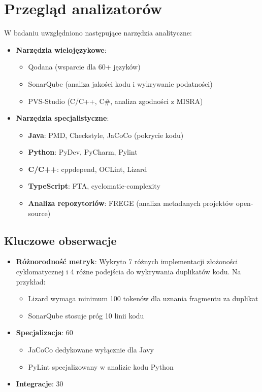\documentclass[a4paper,12pt]{article}
\begin{document}
\section{Przegląd analizatorów}
W badaniu uwzględniono następujące narzędzia analityczne:

\begin{itemize}
\item \textbf{Narzędzia wielojęzykowe}:
\begin{itemize}
\item Qodana (wsparcie dla 60+ języków)
\item SonarQube (analiza jakości kodu i wykrywanie podatności)
\item PVS-Studio (C/C++, C#, analiza zgodności z MISRA)
\end{itemize}

\item \textbf{Narzędzia specjalistyczne}:
\begin{itemize}
\item \textbf{Java}: PMD, Checkstyle, JaCoCo (pokrycie kodu)
\item \textbf{Python}: PyDev, PyCharm, Pylint
\item \textbf{C/C++}: cppdepend, OCLint, Lizard
\item \textbf{TypeScript}: FTA, cyclomatic-complexity
\item \textbf{Analiza repozytoriów}: FREGE (analiza metadanych projektów open-source)
\end{itemize}
\end{itemize}

\subsection*{Kluczowe obserwacje}
\begin{itemize}
\item \textbf{Różnorodność metryk}: Wykryto 7 różnych implementacji złożoności cyklomatycznej i 4 różne podejścia do wykrywania duplikatów kodu. Na przykład:
\begin{itemize}
\item Lizard wymaga minimum 100 tokenów dla uznania fragmentu za duplikat
\item SonarQube stosuje próg 10 linii kodu
\end{itemize}

\item \textbf{Specjalizacja}: 60%
\begin{itemize}
\item JaCoCo dedykowane wyłącznie dla Javy
\item PyLint specjalizowany w analizie kodu Python
\end{itemize}

\item \textbf{Integracje}: 30%
\end{itemize}
\end{document}
